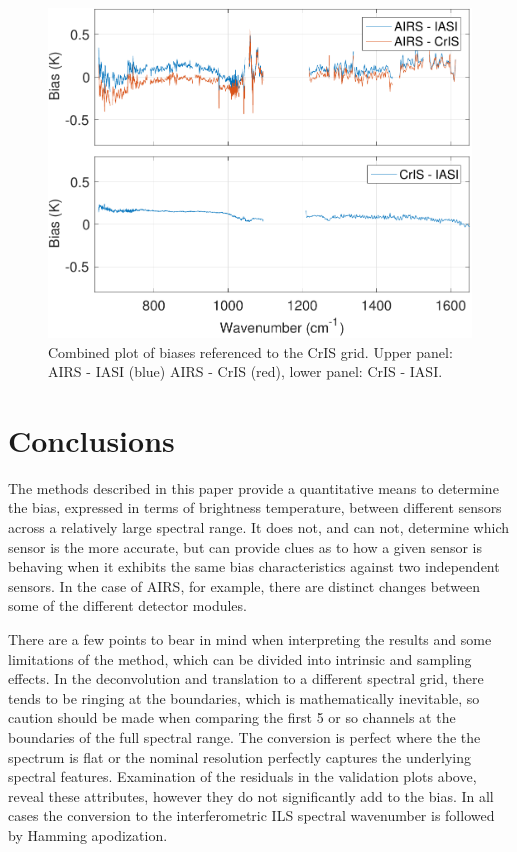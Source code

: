\documentclass[twocolumn,10pt]{article}
\begin{document}
\begin{figure}[htb]
  \centering
    \includegraphics[width=\linewidth]{./figs/ac_ai_ci_bias_lw_mw.pdf}
  \caption{ Combined plot of biases referenced to the CrIS grid. Upper panel: AIRS - IASI (blue) AIRS - CrIS (red), lower panel: CrIS - IASI.}
  \label{fig:U1}
\end{figure}


\section{Conclusions}
The methods described in this paper provide a quantitative means to determine the bias, expressed in terms of brightness temperature, between different sensors across a relatively large spectral range. It does not, and can not, determine which sensor is the more accurate, but can provide clues as to how a given sensor is behaving when it exhibits the same bias characteristics against two independent sensors. In the case of AIRS, for example, there are distinct changes between some of the different detector modules.

There are a few points to bear in mind when interpreting the results and some limitations of the method, which can be divided into intrinsic and sampling effects. In the deconvolution and translation to a different spectral grid, there tends to be ringing at the boundaries, which is mathematically inevitable, so caution should be made when comparing the first 5 or so channels at the boundaries of the full spectral range. The conversion is perfect where the the spectrum is flat or the nominal resolution perfectly captures the underlying spectral features. Examination of the residuals in the validation plots above, reveal these attributes, however they do not significantly add to the bias. In all cases the conversion to the interferometric ILS spectral wavenumber is followed by Hamming apodization.
\end{document}
